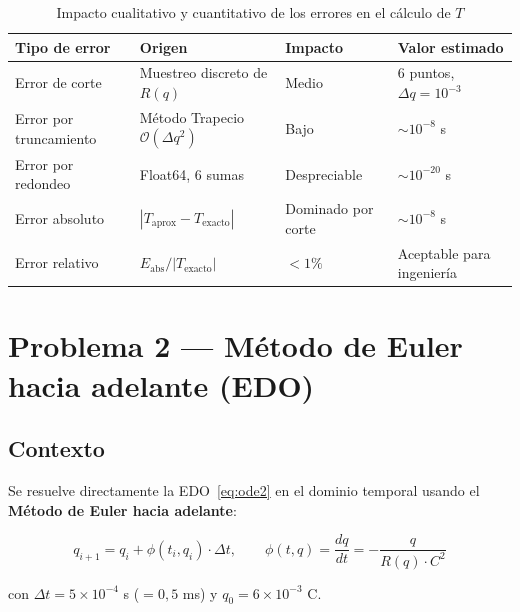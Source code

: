 \documentclass[12pt,a4paper]{article}
\begin{document}
\begin{table}[H]
    \centering
    \caption{Impacto cualitativo y cuantitativo de los errores en el cálculo de $T$}
    \label{tab:errores}
    \begin{tabular}{p{3.5cm}p{3cm}p{3cm}p{4cm}}
        \toprule
        \textbf{Tipo de error} & \textbf{Origen} & \textbf{Impacto} & \textbf{Valor estimado} \\
        \midrule
        Error de corte & Muestreo discreto de $R(q)$ & Medio & 6 puntos, $\Delta q=10^{-3}$ \\
        \midrule
        Error por truncamiento & Método Trapecio $\mathcal{O}(\Delta q^2)$ & Bajo & $\sim 10^{-8}$ s \\
        \midrule
        Error por redondeo & Float64, 6 sumas & Despreciable & $\sim10^{-20}$ s \\
        \midrule
        Error absoluto & $|T_{\text{aprox}} - T_{\text{exacto}}|$ & Dominado por corte & $\sim 10^{-8}$ s \\
        \midrule
        Error relativo & $E_{\text{abs}}/|T_{\text{exacto}}|$ & $<1\%$ & Aceptable para ingeniería \\
        \bottomrule
    \end{tabular}
\end{table}

\newpage
\section{Problema 2 --- Método de Euler hacia adelante (EDO)}

\subsection{Contexto}

Se resuelve directamente la EDO~\eqref{eq:ode2} en el dominio temporal usando
el \textbf{Método de Euler hacia adelante}:

\begin{equation}
    q_{i+1} = q_i + \phi(t_i, q_i)\cdot\Delta t, \qquad
    \phi(t,q) = \frac{dq}{dt} = -\frac{q}{R(q)\cdot C^2}
    \label{eq:euler}
\end{equation}

con $\Delta t = 5\times10^{-4}$ s ($= 0{,}5$ ms) y $q_0 = 6\times10^{-3}$ C.

\end{document}
